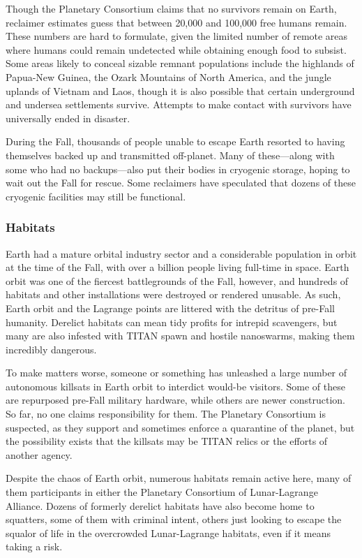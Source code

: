 Though the Planetary Consortium claims that 
no survivors remain on Earth, reclaimer estimates 
guess that between 20,000 and 100,000 free humans 
remain. These numbers are hard to formulate, given 
the limited number of remote areas where humans 
could remain undetected while obtaining enough food 
to subsist. Some areas likely to conceal sizable remnant
populations include the highlands of Papua-New
Guinea, the Ozark Mountains of North America, and 
the jungle uplands of Vietnam and Laos, though it is 
also possible that certain underground and undersea 
settlements survive. Attempts to make contact with 
survivors have universally ended in disaster.

During the Fall, thousands of people unable to 
escape Earth resorted to having themselves backed 
up and transmitted off-planet. Many of these—along 
with some who had no backups—also put their bodies 
in cryogenic storage, hoping to wait out the Fall for 
rescue. Some reclaimers have speculated that dozens 
of these cryogenic facilities may still be functional.

\subsubsection{Habitats}

Earth had a mature orbital industry sector and a considerable
population in orbit at the time of the Fall,
with over a billion people living full-time in space. 
Earth orbit was one of the fiercest battlegrounds of 
the Fall, however, and hundreds of habitats and other 
installations were destroyed or rendered unusable. As 
such, Earth orbit and the Lagrange points are littered 
with the detritus of pre-Fall humanity. Derelict habitats
can mean tidy profits for intrepid scavengers, but
many are also infested with TITAN spawn and hostile 
nanoswarms, making them incredibly dangerous.

To make matters worse, someone or something has 
unleashed a large number of autonomous killsats in 
Earth orbit to interdict would-be visitors. Some of 
these are repurposed pre-Fall military hardware, while 
others are newer construction. So far, no one claims 
responsibility for them. The Planetary Consortium 
is suspected, as they support and sometimes enforce 
a quarantine of the planet, but the possibility exists 
that the killsats may be TITAN relics or the efforts of 
another agency.

Despite the chaos of Earth orbit, numerous habitats 
remain active here, many of them participants in either 
the Planetary Consortium of Lunar-Lagrange Alliance. 
Dozens of formerly derelict habitats have also become 
home to squatters, some of them with criminal intent, 
others just looking to escape the squalor of life in 
the overcrowded Lunar-Lagrange habitats, even if it 
means taking a risk.

